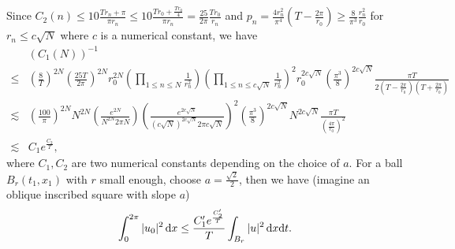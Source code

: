 Since $C_2(n)\le 10\frac{Tr_n+\pi}{\pi r_n}\le 10 \frac{Tr_0+\frac{Tr_0}{4}}{\pi r_n}=\frac{25}{2\pi}\frac{Tr_0}{r_n}$ and $p_n=\frac{4r_n^2}{\pi^4}\left( T-\frac{2\pi}{r_0} \right)\ge \frac{8}{\pi^3}\frac{r_n^2}{r_0}$ for $r_n\le c\sqrt{N} $ where $c$ is a numerical constant, we have
\begin{align*}
  &(C_1(N))^{-1}\\
  \le & \left( \frac{8}{T} \right) ^{2N}\left( \frac{25T}{2\pi} \right) ^{2N}r_0^{2N}\left(\prod_{1\le n\le N}\frac{1}{r_n^2}\right) \left( \prod_{1\le n\le c\sqrt{N} } \frac{1}{r_n^2} \right) ^2 r_0^{2c\sqrt{N} }  \left( \frac{\pi^3}{8} \right)^{2c\sqrt{N} } \frac{\pi T}{2\left( T-\frac{2\pi}{r_0} \right) \left( T+\frac{2\pi}{r_0} \right) }\\
  \lesssim & \left( \frac{100}{\pi} \right) ^{2N} N^{2N} \left( \frac{e^{2N}}{N^{2N}2\pi N} \right) \left( \frac{e^{2c\sqrt{N} }}{\left( c\sqrt{N}  \right) ^{2c\sqrt{N} }2\pi c\sqrt{N} } \right)^2  \left( \frac{\pi^3}{8} \right) ^{2c\sqrt{N} }N^{2c\sqrt{N} } \frac{\pi T}{\left(\frac{4\pi}{r_0}\right)^2}\\
  \lesssim & C_1e^{\frac{C_2}{T}}  
,\end{align*}
where $C_1,C_2$ are two numerical constants depending on the choice of $a$.
For a ball $B_r(t_1,x_1)$ with $r$ small enough, choose $a=\frac{\sqrt{2} }{2}$, then we have (imagine an  oblique  inscribed square with slope $a$) 
\begin{equation}
  \int_{0}^{2\pi}|u_0|^2\,\mathrm{d} x\le \frac{C_1'e^{\frac{C_2'}{T}}}{T}\int_{B_{r}}|u|^2\,\mathrm{d}x \mathrm{d}t.\label{ballcondition}
\end{equation}

